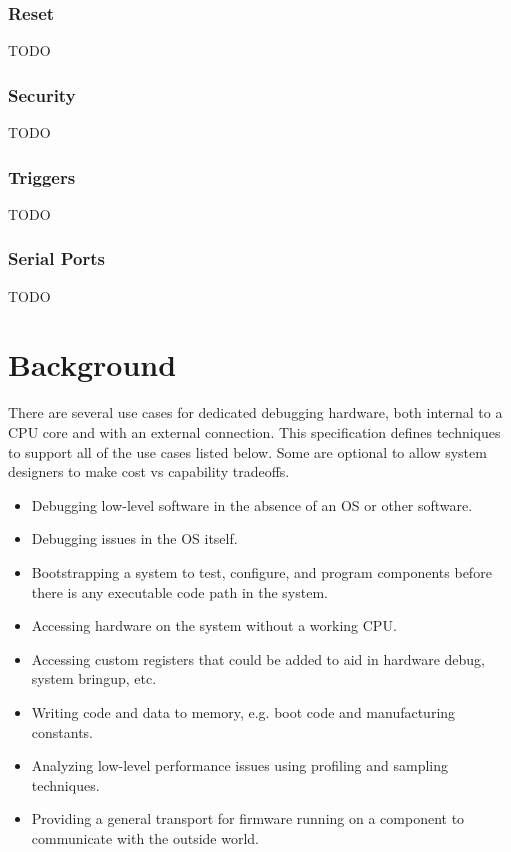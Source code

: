 \documentclass{article}
\begin{document}
\subsubsection{Reset}

TODO

\subsubsection{Security}

TODO

\subsubsection{Triggers}

TODO

\subsubsection{Serial Ports}

TODO

\section{Background}

There are several use cases for dedicated debugging hardware, both
internal to a CPU core and with an external connection.
This specification defines techniques to support all of the use cases
listed below. Some are optional to allow system designers to make
cost vs capability tradeoffs.

\begin{itemize}

\item Debugging low-level software in the absence of an OS or other software.

\item Debugging issues in the OS itself.

\item Bootstrapping a system to test, configure, and program components before
  there is any executable code path in the system.

\item Accessing hardware on the system without a working CPU.

\item Accessing custom registers that could be added to aid in hardware debug, system bringup,
etc.

\item Writing code and data to memory, e.g. boot code and manufacturing constants.

\item Analyzing low-level performance issues using profiling and sampling techniques.

\item Providing a general transport for firmware running on a component to communicate with the
  outside world.

\end{itemize}
\end{document}
